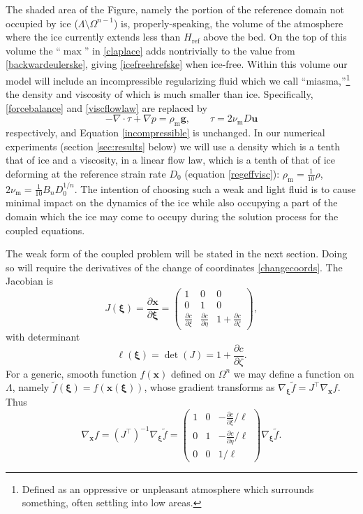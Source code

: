 \documentclass[letterpaper,final,12pt,reqno]{amsart}
\newcommand{\grad}{\nabla}
\newcommand{\bg}{\mathbf{g}}
\newcommand{\bu}{\mathbf{u}}
\newcommand{\bx}{\mathbf{x}}
\newcommand{\bxi}{\bm{\xi}}
\newcommand{\Href}{H_{\text{ref}}}
\newcommand{\num}{\nu_{\text{m}}}
\newcommand{\rhom}{\rho_{\text{m}}}
\begin{document}
The shaded area of the Figure, namely the portion of the reference domain not occupied by ice ($\Lambda \setminus \Omega^{n-1}$) is, properly-speaking, the volume of the atmosphere where the ice currently extends less than $\Href$ above the bed.  On the top of this volume the ``$\max$'' in \eqref{claplace} adds nontrivially to the value from \eqref{backwardeulerske}, giving \eqref{icefreehrefske} when ice-free.  Within this volume our model will include an incompressible regularizing fluid which we call ``miasma,''\footnote{Defined as an oppressive or unpleasant atmosphere which surrounds something, often settling into low areas.} the density and viscosity of which is much smaller than ice.  Specifically, \eqref{forcebalance} and \eqref{viscflowlaw} are replaced by
\begin{equation} %
- \nabla \cdot \tau + \nabla p = \rhom \bg, \qquad \tau = 2 \num D\bu \label{miasma}
\end{equation}
respectively, and Equation \eqref{incompressible} is unchanged.  In our numerical experiments (section \ref{sec:results} below) we will use a density which is a tenth that of ice and a viscosity, in a linear flow law, which is a tenth of that of ice deforming at the reference strain rate $D_0$ (equation \eqref{regeffvisc}): $\rhom = \frac{1}{10} \rho$, $2\num = \frac{1}{10} B_n D_0^{1/n}$.  The intention of choosing such a weak and light fluid is to cause minimal impact on the dynamics of the ice while also occupying a part of the domain which the ice may come to occupy during the solution process for the coupled equations.

The weak form of the coupled problem will be stated in the next section.  Doing so will require the derivatives of the change of coordinates \eqref{changecoords}.  The Jacobian is
\begin{equation}
J(\bxi) = \frac{\partial \bx}{\partial \bm{\xi}} = \begin{pmatrix} 1 & 0 & 0 \\  0 & 1 & 0 \\ \frac{\partial c}{\partial \xi} & \frac{\partial c}{\partial \eta} & 1+\frac{\partial c}{\partial \zeta} \end{pmatrix}, \label{jacchange}
\end{equation}
with determinant  
\begin{equation}
\ell(\bxi) = \det(J) = 1+\frac{\partial c}{\partial \zeta}. \label{definel}
\end{equation}
For a generic, smooth function $f(\bx)$ defined on $\Omega^n$ we may define a function on $\Lambda$, namely $\tilde f(\bxi) = f(\bx(\bxi))$, whose gradient transforms as $\grad_{\bxi} \tilde f = J^\top \grad_{\bx} f$.  Thus
\begin{equation}
\grad_{\bx} f = (J^\top)^{-1} \grad_{\bxi} \tilde f = \begin{pmatrix} 1 & 0 & - \frac{\partial c}{\partial \xi}/\ell \\ 0 & 1 & -\frac{\partial c}{\partial \eta}/\ell \\ 0 & 0 & 1/\ell \end{pmatrix} \grad_{\bxi} \tilde f. \label{changederivatives}
\end{equation}
\end{document}
